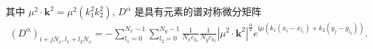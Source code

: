 其中 $\mu^{2} \cdot \mathbf{k}^{2}=\mu^{2}\left(k_{1}^{2} k_{2}^{2}\right)$, $D^{\alpha}$ 是具有元素的谱对称微分矩阵
\begin{align}\label{eq_54}
\left(D^{\alpha}\right)_{i+j N_{x}, l_{1}+l_{2} N_{x}}=-\sum\limits_{l_{1}=0}^{N_{x}-1} \sum\limits_{l_{2}=0}^{N_{y}-1}\frac{1}{N_{x} c_{k_{1}}} \frac{1}{N_{y} c_{k_{2}}}\left|\mu^{2} \cdot \mathbf{k}^{2}\right|^{\frac{\alpha}{2}} e^{\mathrm{i}\mu\left(k_{1}\left(x_{i}-x_{l_{1}}\right)+k_{2}\left(y_{j}-y_{l_{2}}\right)\right)}.
\end{align}



	

